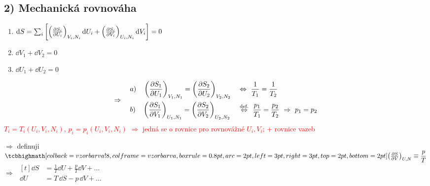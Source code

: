 \subsection*{2) Mechanická rovnováha}

\begin{minipage}{0.45\textwidth}
\end{minipage}
\begin{minipage}{0.53\textwidth}
\begin{enumerate}[label=\roman*),nosep]
  \item $\dd S = \sum_i\left[\left(\pdv{S_i}{U_i}\right)_{V_i,N_i}\dd U_i + \left(\pdv{S_i}{V_i}\right)_{U_i,N_i}\dd V_i\right] = 0$
  \item $\dd V_1 + \dd V_2 = 0$
  \item $\dd U_1 + \dd U_2 = 0$
\end{enumerate}
\medskip
\textcolor{NavyBlue}{}
\end{minipage}

\[
  \Rightarrow\quad
  \begin{aligned}
    &a)\quad \left(\pdv{S_1}{U_1}\right)_{V_1,N_1} = \left(\pdv{S_2}{U_2}\right)_{V_2,N_2}
      &&\Leftrightarrow\ \frac{1}{T_1} = \frac{1}{T_2} \\
    &b)\quad \left(\pdv{S_1}{V_1}\right)_{U_1,N_1} = \left(\pdv{S_2}{V_2}\right)_{U_2,N_2}
      &&\overset{\text{def.}}{\Leftrightarrow}\ \frac{p_1}{T_1} = \frac{p_2}{T_2} \ \Rightarrow\ p_1 = p_2
  \end{aligned}
\]
\textcolor{Red}{\small $T_i = T_i(U_i,V_i,N_i)$, $p_i = p_i(U_i,V_i,N_i)$ $\Rightarrow$ jedná se o rovnice pro rovnovážné $U_i, V_i$; + rovnice vazeb}

\begin{definice}[Tlak]
$\Rightarrow$ definuji \qquad
$\vzorec{\left(\pdv{S}{V}\right)_{U,N} \equiv \dfrac{p}{T}}$
\qquad $\Rightarrow$ \quad
$\begin{aligned}[t]
  \dd S &= \tfrac1T\dd U + \tfrac{p}{T}\dd V + \dots \\
  \dd U &= T\,\dd S - p\,\dd V + \dots
\end{aligned}$
\end{definice}

